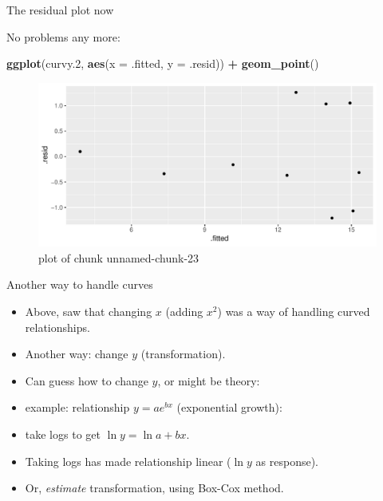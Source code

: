 \documentclass[ignorenonframetext,]{beamer}
\newenvironment{Shaded}{\begin{snugshade}}{\end{snugshade}}
\newcommand{\DataTypeTok}[1]{\textcolor[rgb]{0.13,0.29,0.53}{#1}}
\newcommand{\FloatTok}[1]{\textcolor[rgb]{0.00,0.00,0.81}{#1}}
\newcommand{\KeywordTok}[1]{\textcolor[rgb]{0.13,0.29,0.53}{\textbf{#1}}}
\newcommand{\NormalTok}[1]{#1}
\newcommand{\OperatorTok}[1]{\textcolor[rgb]{0.81,0.36,0.00}{\textbf{#1}}}
\newcommand{\StringTok}[1]{\textcolor[rgb]{0.31,0.60,0.02}{#1}}
\begin{document}
\begin{frame}[fragile]{The residual plot now}
\protect\hypertarget{the-residual-plot-now}{}

No problems any more:

\begin{Shaded}
\begin{Highlighting}[]
\KeywordTok{ggplot}\NormalTok{(curvy}\FloatTok{.2}\NormalTok{, }\KeywordTok{aes}\NormalTok{(}\DataTypeTok{x =}\NormalTok{ .fitted, }\DataTypeTok{y =}\NormalTok{ .resid)) }\OperatorTok{+}\StringTok{ }\KeywordTok{geom_point}\NormalTok{()}
\end{Highlighting}
\end{Shaded}

\begin{figure}
\centering
\includegraphics{figure/unnamed-chunk-23-1.pdf}
\caption{plot of chunk unnamed-chunk-23}
\end{figure}

\end{frame}

\begin{frame}{Another way to handle curves}
\protect\hypertarget{another-way-to-handle-curves}{}

\begin{itemize}
\item
  Above, saw that changing \(x\) (adding \(x^2\)) was a way of handling
  curved relationships.
\item
  Another way: change \(y\) (transformation).
\item
  Can guess how to change \(y\), or might be theory:
\item
  example: relationship \(y=ae^{bx}\) (exponential growth):
\item
  take logs to get \(\ln y=\ln a + bx\).
\item
  Taking logs has made relationship linear (\(\ln y\) as response).
\item
  Or, \emph{estimate} transformation, using Box-Cox method.
\end{itemize}

\end{frame}
\end{document}
